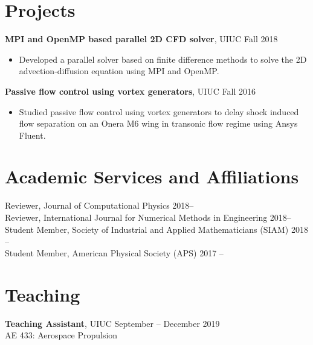 \documentclass[margin]{res}
\begin{document}
\begin{resume}

\section{\large Projects}

{\bf MPI and OpenMP based parallel 2D CFD solver}, UIUC \hfill Fall 2018
\begin{itemize}
\item Developed a parallel solver based on finite difference methods to solve the 2D advection-diffusion equation using MPI and OpenMP.
\end{itemize}

{\bf Passive flow control using vortex generators}, UIUC \hfill Fall 2016
\begin{itemize}
\item Studied passive flow control using vortex generators to delay shock induced flow separation on an Onera M6 wing in transonic flow regime using Ansys Fluent.
\end{itemize}

\section{\large Academic Services and Affiliations}		 
Reviewer, Journal of Computational Physics \hfill 2018--\vspace{0.1cm}\\
Reviewer, International Journal for Numerical Methods in Engineering \hfill 2018--\vspace{0.1cm}\\
Student Member, Society of Industrial and Applied Mathematicians (SIAM) \hfill 2018 --\vspace{0.1cm}\\
Student Member, American Physical Society (APS) \hfill 2017 --
		 
\section{\large Teaching}
{\bf Teaching Assistant}, UIUC \hfill September -- December 2019 \\
AE 433: Aerospace Propulsion
\vspace{-0.1cm}


\end{resume}
\end{document}

